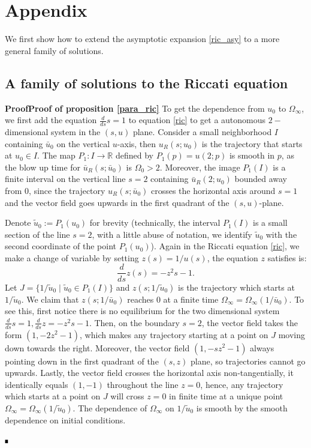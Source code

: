 \documentclass[letterpaper,11pt]{article}
\numberwithin{equation}{section}
\theoremstyle{plain}
\newenvironment{Proof}[1][.]%
 {\begin{trivlist}\item[]\textbf{Proof#1 }}%
 {\hspace*{\fill}$\rule{0.3\baselineskip}{0.35\baselineskip}$\end{trivlist}}
\begin{document}
\section*{Appendix}
\renewcommand{\thesubsection}{\Alph{subsection}}
We first show how to extend the asymptotic expansion \eqref{ric_asy} to a more general family of solutions.
\subsection{A family of solutions to the Riccati equation }


\begin{Proof}[\textbf{Proof of proposition \ref{para_ric}}] To get the dependence from $u_0$ to $\Omega_\infty$, we first add the equation $\frac{d}{ds}s=1$ to equation \eqref{ric} to get a autonomous $2-$dimensional system in the $(s,u)$ plane. Consider a small neighborhood $I$ containing $\bar{u}_0$ on the vertical $u$-axis, then $u_R(s; u_0)$ is the trajectory that starts at $u_0 \in I$. The map $P_1 : I \to \mathbb{R}$ defined by $P_1(p) = u(2; p)$ is smooth in $p$, as the blow up time for $\bar{u}_R(s;\bar{u}_0)$ is $\Omega_0 >2$. Moreover, the image $P_1(I)$ is a finite interval on the vertical line $s=2$ containing $\bar{u}_R(2;u_0)$ bounded away from $0$, since the trajectory $u_R(s;\bar{u}_0)$ crosses the horizontal axis around $s=1$ and the vector field goes upwards in the first quadrant of the $(s,u)$-plane.

Denote $\tilde{u}_0:= P_1(u_0)$ for brevity (technically, the interval $P_1(I)$ is a small section of the line $s=2$, with a little abuse of notation, we identify $\tilde{u}_0$ with the second coordinate of the point $P_1(u_0)$). Again in the Riccati equation \eqref{ric}, we make a change of variable by setting $z(s) = 1/u(s)$, the equation $z$ satisfies is:
\[
\frac{d}{ds}z(s) = -z^2s -1.
\]
Let $J = \{ 1/\tilde{u}_0 \mid  \tilde{u}_0 \in P_1(I)\}$ and $z(s; 1/\tilde{u}_0)$ is the trajectory which starts at $1/\tilde{u}_0$. We claim that $z(s; 1/\bar{u}_0)$ reaches $0$ at a finite time $\Omega_\infty = \Omega_\infty(1/\bar{u}_0)$. To see this, first notice there is no equilibrium for the two dimensional system $\frac{d}{ds}s=1, \frac{d}{ds}z=-z^2s-1$. Then, on the boundary $s=2$, the vector field takes the form $(1,-2z^2-1)$, which makes any trajectory starting at a point on $J$ moving down towards the right. Moreover, the vector field $(1,-sz^2-1)$ always pointing down in the first quadrant of the $(s,z)$ plane, so trajectories cannot go upwards. Lastly, the vector field crosses the horizontal axis non-tangentially, it identically equals $(1,-1)$ throughout the line $z=0$, hence, any trajectory which starts at a point on $J$ will cross $z=0$ in finite time at a unique point $\Omega_\infty = \Omega_\infty(1/\tilde{u}_0)$. The dependence of $\Omega_\infty$ on $1/\tilde{u}_0$ is smooth by the smooth dependence on initial conditions.


\end{Proof}
\end{document}
